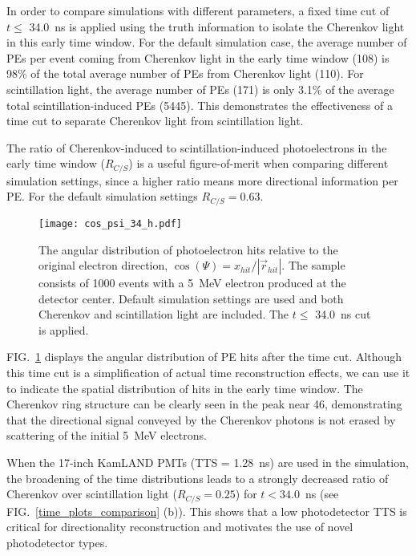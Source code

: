 \documentclass[aps,prc,twocolumn,groupedaddress,showpacs,amsmath,amssymb,floatfix,superscriptaddress]{revtex4}
\begin{document}
In order to compare simulations with different parameters, a fixed
time cut of $t\leq$ 34.0~ns is applied using the truth information to
isolate the Cherenkov light in this early time window. For the default
simulation case, the average number of PEs per event coming from
Cherenkov light in the early time window (108) is 98\% of the total
average number of PEs from Cherenkov light (110). For scintillation
light, the average number of PEs (171) is only 3.1\% of the average total
scintillation-induced PEs (5445). This demonstrates the effectiveness of
a time cut to separate Cherenkov light from scintillation light. 

The ratio of Cherenkov-induced to scintillation-induced photoelectrons
in the early time window ($R_{C/S}$) is a useful figure-of-merit when
comparing different simulation settings, since a higher ratio means
more directional information per PE. For the default simulation
settings $R_{C/S}=0.63$.

\begin{figure}
        \begin{center}
        \texttt{[image: cos\_psi\_34\_h.pdf]}
        \caption[]{The angular distribution of photoelectron hits
        relative to the original electron direction, $\cos(\Psi) =
        x_{hit}/|\vec{r}_{hit}|$. The sample consists of 1000 events
        with a 5~MeV electron produced at the detector center. Default
        simulation settings are used and both Cherenkov and
        scintillation light are included. The $t\leq$ 34.0~ns cut is applied.} 
        \label{Cherenkov_cone}
        \end{center}
\end{figure}

FIG.~\ref{Cherenkov_cone} displays the angular distribution of PE
hits after the time cut. Although this time cut is a simplification of actual time
reconstruction effects, we can use it to indicate the spatial
distribution of hits in the early time window. The Cherenkov ring structure
can be clearly seen in the peak near 46\textdegree, demonstrating
that the directional signal conveyed by the Cherenkov photons is not
erased by scattering of the initial 5~MeV electrons.

When the 17-inch KamLAND PMTs\cite{tajimaMaster,kume_1983} (TTS =
1.28~ns) are used in the simulation, the broadening of the time
distributions leads to a strongly decreased ratio of Cherenkov over
scintillation light ($R_{C/S}=0.25$) for $t<34.0$~ns (see
FIG.~\ref{time_plots_comparison} (b)). This shows that a low
photodetector TTS is critical for directionality reconstruction and
motivates the use of novel photodetector types.
\end{document}
